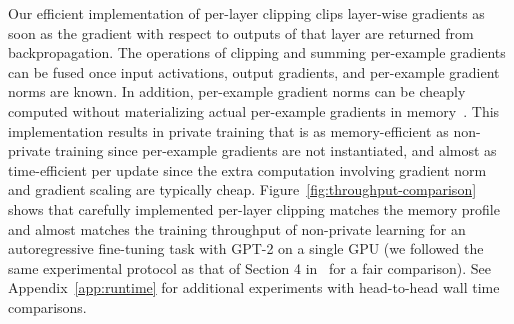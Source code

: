 Our efficient implementation of per-layer clipping clips layer-wise gradients as soon as the gradient with respect to outputs of that layer are returned from backpropagation.
The operations of clipping and summing per-example gradients can be fused once input activations, output gradients, and per-example gradient norms are known. In addition, per-example gradient norms can be cheaply computed without materializing actual per-example gradients in memory~\citep[Section 4]{li2022large}.
This implementation results in private training that is as memory-efficient as non-private training since per-example gradients are not instantiated, and almost as time-efficient per update since the extra computation involving gradient norm and gradient scaling are typically cheap.
Figure~\ref{fig:throughput-comparison} shows that carefully implemented per-layer clipping matches the memory profile and almost matches the training throughput of non-private learning for an autoregressive fine-tuning task with GPT-2 on a single GPU (we followed the same experimental protocol as that of Section 4 in~\citep{li2022large} for a fair comparison).
See Appendix~\ref{app:runtime} for additional experiments with head-to-head wall time comparisons. 








    
    






